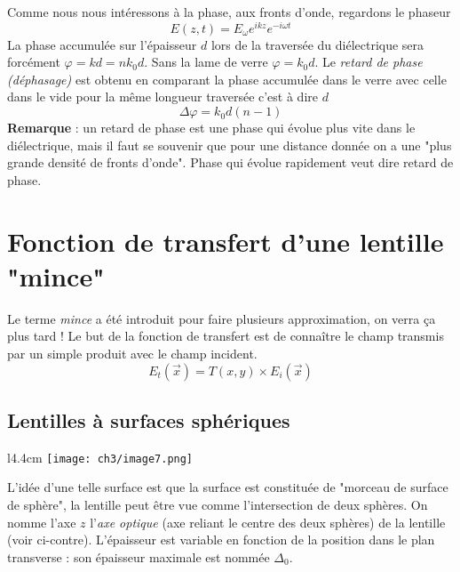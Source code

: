 Comme nous nous intéressons à la phase, aux fronts d'onde, regardons le phaseur
\begin{equation}
E(z,t) = E_\omega e^{ikz}e^{-i\omega t}
\end{equation}
La phase accumulée sur l'épaisseur $d$ lors de la traversée du diélectrique sera forcément $\varphi = kd = nk_0d$. 
Sans la lame de verre 
$\varphi = k_0d$. Le \textit{retard de phase (déphasage)} est obtenu en comparant la phase accumulée 
dans le verre avec celle dans le vide pour la même longueur traversée c'est à dire $d$
\begin{equation}
\Delta\varphi = k_0d(n-1)
\end{equation}
\textbf{Remarque} : un retard de phase est une phase qui évolue plus vite dans le diélectrique, mais 
il faut se souvenir que pour une distance donnée on a une "plus grande densité de fronts d'onde". Phase 
qui évolue rapidement veut dire retard de phase.\\


\newpage
\section{Fonction de transfert d'une lentille "mince"}
Le terme \textit{mince} a été introduit pour faire plusieurs approximation, on verra ça plus tard ! Le 
but de la fonction de transfert est de connaître le champ transmis par un simple produit avec le champ 
incident.
\begin{equation}
E_t(\vec{x}) = T(x,y)\times E_i(\vec{x})
\end{equation}

	\subsection{Lentilles à surfaces sphériques}
	\begin{wrapfigure}[7]{l}{4.4cm}
	\vspace{-5mm}
	\texttt{[image: ch3/image7.png]}
	\end{wrapfigure}
	L'idée d'une telle surface est que la surface est constituée de "morceau de surface de sphère", 
	la lentille peut être vue comme l'intersection de deux sphères. On nomme l'axe $z$ 
	l'\textit{axe optique} (axe reliant le centre des deux sphères) de la lentille (voir ci-contre). 
	L'épaisseur est variable en fonction de la position dans le plan transverse : son épaisseur 
	maximale est nommée $\Delta_0$.\\
	
